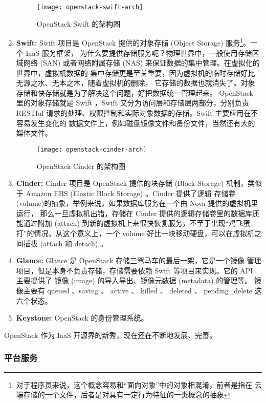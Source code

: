 \begin{enumerate}
\begin{figure}[h]
        \centering
        \texttt{[image: openstack-swift-arch]}
        \caption{OpenStack Swift 的架构图}
    \end{figure}
    \item \textbf{Swift:} Swift 项目是 OpenStack 提供的对象存储 (Object Storage)
     服务\footnote{对于程序员来说，这个概念容易和“面向对象”中的对象相混淆，前者是指在
    云端存储的一个文件，后者是对具有一定行为特征的一类概念的抽象}。一个 IaaS 服务框架，
    为什么要提供存储服务呢？物理世界中，一般使用存储区域网络
     (SAN) 或者网络附属存储 (NAS) 来保证数据的集中管理。在虚拟化的世界中，虚拟机数据的
    集中存储更是至关重要，因为虚拟机的临时存储好比无源之水、无本之木，随着虚拟机的删除，
    它存储的数据也就消失了。对象存储和快存储就是为了解决这个问题，好把数据统一管理起来。
    OpenStack 里的对象存储就是 Swift ，Swift 又分为访问层和存储层两部分，分别负责
    RESTful 请求的处理、权限控制和实际对象数据的存储。Swift 主要应用在不容易发生变化的
    数据文件上，例如磁盘镜像文件和备份文件，当然还有大的媒体文件。
    \begin{figure}[h]
        \centering
        \texttt{[image: openstack-cinder-arch]}
        \caption{OpenStack Cinder 的架构图}
    \end{figure}
    \item \textbf{Cinder:} Cinder 项目是 OpenStack 提供的块存储 (Block Storage)
     机制，类似于 Amazon EBS (Elastic Block Storage) 。Cinder 提供了逻辑
    存储卷 (volume)的抽象，举例来说，如果数据库服务在一个由 Nova 提供的虚拟机里运行，
    那么一旦虚拟机出错，存储在 Cinder 提供的逻辑存储卷里的数据库还能通过附加 (attach)
     到新的虚拟机上来很快恢复服务，不至于出现“鸡飞蛋打”的情况。从这个意义上，一个 volume
     好比一块移动硬盘，可以在虚拟机之间插拔 (attach 和 detach) 。~\cite{cinder}
    \item \textbf{Glance:} Glance 是 OpenStack 存储三驾马车的最后一架，它是一个镜像
    管理项目，但是本身不负责存储，存储需要依赖 Swift 等项目来实现。它的 API 主要提供了
    镜像 (image) 的导入导出、镜像元数据 (metadata) 的管理等。
    镜像主要有 queued 、saving 、 active 、 killed 、
     deleted 、 pending\_delete 这六个状态。
    \item \textbf{Keystone:} OpenStack 的身份管理系统。
\end{enumerate}

OpenStack 作为 IaaS 开源界的新秀，现在还在不断地发展、完善。

\subsubsection{平台服务}

